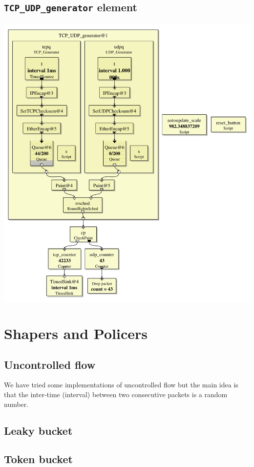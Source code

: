 \documentclass[a4paper]{article}
\begin{document}
  \subsection{\texttt{TCP\_UDP\_generator} element}
    \begin{center}
	  \includegraphics[scale=0.55]{../2-tcp-udp-generation/TCP_UDP_generator.pdf}
	  \label{fig:tcpudp}
  \end{center}
  \section{Shapers and Policers}
  \subsection{Uncontrolled flow}
  We have tried some implementations of uncontrolled flow but the main idea is
  that the inter-time (interval) between two consecutive packets is a random
  number.
  \subsection{Leaky bucket}
  \subsection{Token bucket}
\end{document}
